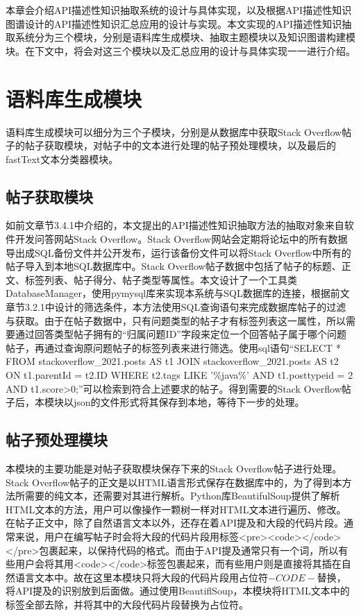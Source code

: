 本章会介绍API描述性知识抽取系统的设计与具体实现，以及根据API描述性知识图谱设计的API描述性知识汇总应用的设计与实现。本文实现的API描述性知识抽取系统分为三个模块，分别是语料库生成模块、抽取主题模块以及知识图谱构建模块。在下文中，将会对这三个模块以及汇总应用的设计与具体实现一一进行介绍。

\section{语料库生成模块}
语料库生成模块可以细分为三个子模块，分别是从数据库中获取Stack Overflow帖子的帖子获取模块，对帖子中的文本进行处理的帖子预处理模块，以及最后的fastText文本分类器模块。

\subsection{帖子获取模块}如前文章节3.4.1中介绍的，本文提出的API描述性知识抽取方法的抽取对象来自软件开发问答网站Stack Overflow。Stack Overflow网站会定期将论坛中的所有数据导出成SQL备份文件并公开发布，运行该备份文件可以将Stack Overflow中所有的帖子导入到本地SQL数据库中。Stack Overflow帖子数据中包括了帖子的标题、正文、标签列表、帖子得分、帖子类型等属性。本文设计了一个工具类DatabaseManager，使用pymysql库来实现本系统与SQL数据库的连接，根据前文章节3.2.1中设计的筛选条件，本方法使用SQL查询语句来完成数据库帖子的过滤与获取。由于在帖子数据中，只有问题类型的帖子才有标签列表这一属性，所以需要通过回答类型帖子拥有的“归属问题ID”字段来定位一个回答帖子属于哪个问题帖子，再通过查询原问题帖子的标签列表来进行筛选。使用sql语句“SELECT * FROM stackoverflow\_2021.posts AS t1 JOIN stackoverflow\_2021.posts AS t2 ON t1.parentId = t2.ID WHERE t2.tags LIKE '\%java\%' AND t1.posttypeid = 2 AND t1.score\textgreater{0};”可以检索到符合上述要求的帖子。得到需要的Stack Overflow帖子后，本模块以json的文件形式将其保存到本地，等待下一步的处理。

\subsection{帖子预处理模块}
本模块的主要功能是对帖子获取模块保存下来的Stack Overflow帖子进行处理。Stack Overflow帖子的正文是以HTML语言形式保存在数据库中的，为了得到本方法所需要的纯文本，还需要对其进行解析。Python库BeautifulSoup提供了解析HTML文本的方法，用户可以像操作一颗树一样对HTML文本进行遍历、修改。在帖子正文中，除了自然语言文本以外，还存在着API提及和大段的代码片段。通常来说，用户在编写帖子时会将大段的代码片段用标签<pre><code></code></pre>包裹起来，以保持代码的格式。而由于API提及通常只有一个词，所以有些用户会将其用<code></code>标签包裹起来，而有些用户则是直接将其插在自然语言文本中。故在这里本模块只将大段的代码片段用占位符$-CODE-$替换，将API提及的识别放到后面做。通过使用BeautiflSoup，本模块将HTML文本中的标签全部去除，并将其中的大段代码片段替换为占位符。

